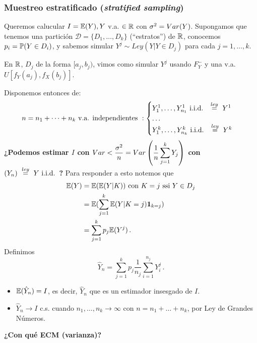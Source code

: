 \subsubsection{Muestreo estratificado (\textit{stratified sampling})}
\label{estratificado}
Queremos calucular $I=\E(Y), Y$ v.a. $\in\R$ con $\sigma^2=\var(Y)$. 
\newline Supongamos que tenemos una partición $\mathcal{D}=\{D_1,\dots,D_k\}$ (``estratos'') de $\R$, conocemos \\ $p_i=\P(Y\in D_i)$, y sabemos simular $Y^j\sim Ley(Y | Y \in D_j)$ para cada $j=1,\dots,k$.
\begin{example}
En $\R$, $D_j$ de la forma $[a_j,b_j)$, vimos como simular $Y^j$ usando $F_Y^-$ y una v.a. $U[f_Y(a_j),f_X(b_j)]$.
\end{example}
Disponemos entonces de:
$$ n=n_1+\dots+n_k \mbox{ v.a. independientes }:\begin{cases}
Y^1_1,\dots,Y^1_{n_1} \iid \igualley Y^1 &\\
\dots & \\
Y^k_1,\dots,Y^k_{n_k} \iid \igualley Y^k &
\end{cases} $$
\textbf{¿Podemos estimar $I$ con $\var<\displaystyle\frac{\sigma^2}{n}=\var\left(\frac{1}{n}\sum^k_{j=1}Y_j\right)$ con $(Y_n)\igualley Y \iid$?}
Para responder a esto notemos que
\begin{alignat*}{2}
    \E(Y) & = \E(\E(Y|K)) \mbox{ con }K=j \mbox{ ssi }Y\in D_j\\
     & = \displaystyle\E(\sum^k_{j=1}\E(Y|K=j)\mathbf{1}_{k=j}) \\
     & = \displaystyle\sum^k_{j=1}p_j\E(Y^j) \, .
\end{alignat*}
Definimos
$$ \hat{Y}_n=\displaystyle\sum^k_{j=1}p_j\frac{1}{n_j}\sum^{n_j}_{i=1}Y^j_i \, .$$
\begin{remark}
\beforeitemize
\begin{itemize}
    \item $\E(\hat{Y}_n)=I$, es decir, $\hat{Y}_n$ que es un estimador insesgado de $I$.
    \item $\hat{Y}_n\to I$ c.s.  cuando  $n_1, \dots, n_k\to \infty $ con   $n=n_1+ \dots + n_k $, por Ley de Grandes N\'umeros. 
\end{itemize}
\end{remark}
\textbf{¿Con qué ECM (varianza)?}
